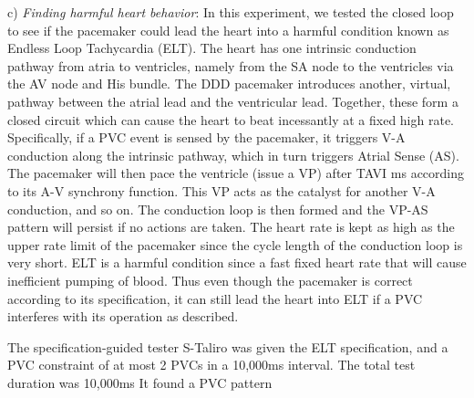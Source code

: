 c) \emph{Finding harmful heart behavior}: In this experiment, we tested the closed loop to see if the pacemaker could lead the heart into a harmful condition known as Endless Loop Tachycardia (ELT).
The heart has one intrinsic conduction pathway from atria to ventricles, namely from the SA node to the ventricles via the AV node and His bundle.
The DDD pacemaker introduces another, virtual, pathway between the atrial lead and the ventricular lead.
Together, these form a closed circuit which can cause the heart to beat incessantly at a fixed high rate.
Specifically, if a PVC event is sensed by the pacemaker, it triggers V-A conduction along the intrinsic pathway, 
which in turn triggers Atrial Sense (AS). 
The pacemaker will then pace the ventricle (issue a VP) after TAVI ms according to its A-V synchrony function. 
This VP acts as the catalyst for another V-A conduction, and so on.
The conduction loop is then formed and the VP-AS pattern will persist if no actions are taken.
The heart rate is kept as high as the upper rate limit of the pacemaker since the cycle length of the conduction loop is very short. 
ELT is a harmful condition since a fast fixed heart rate that will cause inefficient pumping of blood.
Thus even though the pacemaker is correct according to its specification, it can still lead the heart into ELT if a PVC interferes with its operation as described.

The specification-guided tester S-Taliro was given the ELT specification, and a PVC constraint of at most 2 PVCs in a 10,000ms interval. 
The total test duration was 10,000ms
It found a PVC pattern

